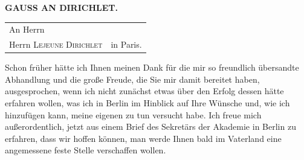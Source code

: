 \clearpage\renewcommand{\BookRunningTitle}{Gauss an Dirichlet.}
\begingroup\fontsize{10.5}{12}\selectfont
{}
\begin{center}\textbf{GAUSS AN DIRICHLET.}\end{center}
\begin{center}
\begin{tabular}{ll}
\hline
An Herrn&\\
\quad Herrn \textsc{Lejeune Dirichlet}&\quad in Paris.\\
\hline
\end{tabular}
\end{center}
Schon früher hätte ich Ihnen meinen Dank für die mir so freundlich übersandte Abhandlung und die große Freude, die Sie mir damit bereitet haben, ausgesprochen, wenn ich nicht zunächst etwas über den Erfolg dessen hätte erfahren wollen, was ich in Berlin im Hinblick auf Ihre Wünsche und, wie ich hinzufügen kann, meine eigenen zu tun versucht habe. Ich freue mich außerordentlich, jetzt aus einem Brief des Sekretärs der Akademie in Berlin zu erfahren, dass wir hoffen können, man werde Ihnen bald im Vaterland eine angemessene feste Stelle verschaffen wollen.
